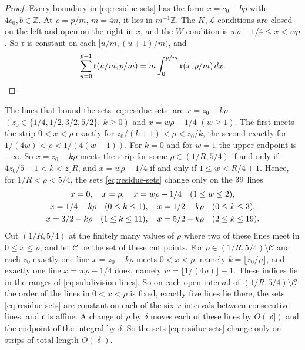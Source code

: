 \documentclass{amsart}
\numberwithin{equation}{section}
\numberwithin{table}{section}
\newcommand{\Z}{\mathbb{Z}}
\newcommand{\Rseam}{8}
\newcommand{\fdiv}[2]{\the\numexpr(2*(#1)-(#2)+1)/(2*(#2))\relax}%
\newcommand{\kLlo}{\fdiv{\Rseam-1}{4}}
\newcommand{\kKlo}{\fdiv{\Rseam-1}{2}}
\newcommand{\kKhi}{\fdiv{3*\Rseam-1}{2}}
\newcommand{\kLhi}{\fdiv{5*\Rseam-1}{2}}
\newcommand{\wmax}{\fdiv{\Rseam+3}{4}}
\newcommand{\nlines}{\the\numexpr 2+(\kLlo+1)+(\kKlo+1)+\kKhi+(\kLhi-1)+\wmax\relax}
\begin{document}
\begin{proof}
Every boundary in \eqref{eq:residue-sets} has the form $x=c_0+b\rho$ with
$4c_0,b\in\Z$. At $\rho=p/m$, $m=4n$, it lies in $m^{-1}\Z$. The $K,\mathcal L$
conditions are closed on the left and open on the right in $x$, and the
$W$ condition is $w\rho-1/4\le x<w\rho$. So $\mathfrak r$ is constant on
each $[u/m,(u+1)/m)$, and
\begin{equation}\label{eq:lattice-sum}
 \sum_{u=0}^{p-1}\mathfrak r(u/m,p/m)=m\int_0^{p/m}\mathfrak r(x,p/m)\,dx.\qedhere
\end{equation}
\end{proof}

The lines that bound the sets \eqref{eq:residue-sets} are
$x=z_0-k\rho$ $(z_0\in\{1/4,1/2,3/2,5/2\},\ k\ge0)$ and $x=w\rho-1/4$
$(w\ge1)$. The first meets the strip $0<x<\rho$ exactly for
$z_0/(k+1)<\rho<z_0/k$, the second exactly for $1/(4w)<\rho<1/(4(w-1))$. For
$k=0$ and for $w=1$ the upper endpoint is $+\infty$. So $x=z_0-k\rho$ meets
the strip for some $\rho\in(1/R,5/4)$ if and only if $4z_0/5-1<k<z_0R$, and
$x=w\rho-1/4$ if and only if $1\le w<R/4+1$. Hence, for $1/R<\rho<5/4$, the
sets \eqref{eq:residue-sets} change only on the $\nlines$ lines
\begin{equation}\label{eq:subdivision-lines}
\begin{gathered}
 x=0,\quad x=\rho,\quad x=w\rho-1/4\quad(1\le w\le\wmax),\\
 x=1/4-k\rho\quad(0\le k\le\kLlo),\quad x=1/2-k\rho\quad(0\le k\le\kKlo),\\
 x=3/2-k\rho\quad(1\le k\le\kKhi),\quad x=5/2-k\rho\quad(2\le k\le\kLhi).
\end{gathered}
\end{equation}
Cut $(1/R,5/4)$ at the finitely many values of $\rho$ where two of these
lines meet in $0\le x\le\rho$, and let $\mathcal C$ be the set of these cut
points. For $\rho\in(1/R,5/4)\setminus\mathcal C$ and each $z_0$ exactly one
line $x=z_0-k\rho$ meets $0<x<\rho$, namely $k=\lfloor z_0/\rho\rfloor$, and
exactly one line $x=w\rho-1/4$ does, namely $w=\lfloor1/(4\rho)\rfloor+1$.
These indices lie in the ranges of \eqref{eq:subdivision-lines}. So on each
open interval of $(1/R,5/4)\setminus\mathcal C$ the order of the lines in
$0<x<\rho$ is fixed, exactly five lines lie there, the sets
\eqref{eq:residue-sets} are constant on each of the six $x$-intervals
between consecutive lines, and $\mathfrak c$ is affine.
A change of $\rho$ by $\delta$ moves each of these lines by $O(|\delta|)$ and
the endpoint of the integral by $\delta$. So the sets
\eqref{eq:residue-sets} change only on strips of total length $O(|\delta|)$.
\end{document}
